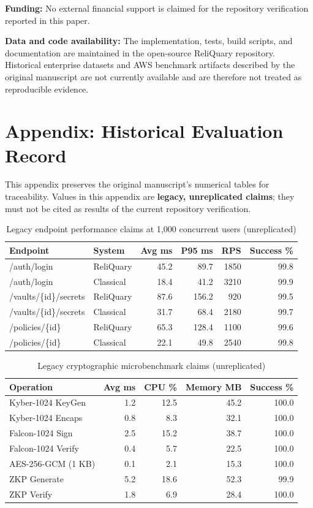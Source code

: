 \documentclass[10pt]{article}
\begin{document}
\textbf{Funding:} No external financial support is claimed for the repository verification reported in this paper.

\textbf{Data and code availability:} The implementation, tests, build scripts, and documentation are maintained in the open-source ReliQuary repository. Historical enterprise datasets and AWS benchmark artifacts described by the original manuscript are not currently available and are therefore not treated as reproducible evidence.

\section*{Appendix: Historical Evaluation Record}
This appendix preserves the original manuscript's numerical tables for traceability. Values in this appendix are \textbf{legacy, unreplicated claims}; they must not be cited as results of the current repository verification.

\begin{table}[H]
\centering
\caption{Legacy endpoint performance claims at 1,000 concurrent users (unreplicated)}
\begin{tabular}{llrrrr}
\toprule
\textbf{Endpoint} & \textbf{System} & \textbf{Avg ms} & \textbf{P95 ms} & \textbf{RPS} & \textbf{Success \%}\\
\midrule
/auth/login & ReliQuary & 45.2 & 89.7 & 1850 & 99.8\\
/auth/login & Classical & 18.4 & 41.2 & 3210 & 99.9\\
/vaults/\{id\}/secrets & ReliQuary & 87.6 & 156.2 & 920 & 99.5\\
/vaults/\{id\}/secrets & Classical & 31.7 & 68.4 & 2180 & 99.7\\
/policies/\{id\} & ReliQuary & 65.3 & 128.4 & 1100 & 99.6\\
/policies/\{id\} & Classical & 22.1 & 49.8 & 2540 & 99.8\\
\bottomrule
\end{tabular}
\end{table}

\begin{table}[H]
\centering
\caption{Legacy cryptographic microbenchmark claims (unreplicated)}
\begin{tabular}{lrrrr}
\toprule
\textbf{Operation} & \textbf{Avg ms} & \textbf{CPU \%} & \textbf{Memory MB} & \textbf{Success \%}\\
\midrule
Kyber-1024 KeyGen & 1.2 & 12.5 & 45.2 & 100.0\\
Kyber-1024 Encaps & 0.8 & 8.3 & 32.1 & 100.0\\
Falcon-1024 Sign & 2.5 & 15.2 & 38.7 & 100.0\\
Falcon-1024 Verify & 0.4 & 5.7 & 22.5 & 100.0\\
AES-256-GCM (1 KB) & 0.1 & 2.1 & 15.3 & 100.0\\
ZKP Generate & 5.2 & 18.6 & 52.3 & 99.9\\
ZKP Verify & 1.8 & 6.9 & 28.4 & 100.0\\
\bottomrule
\end{tabular}
\end{table}
\end{document}
